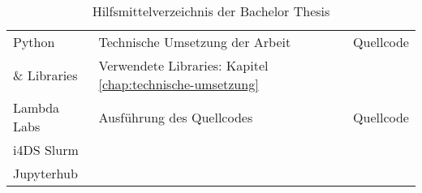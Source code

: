 \begin{table}[ht!]
\begin{tabular}{l|l|l}
        \hline
        Python & Technische Umsetzung der Arbeit &  Quellcode \\
        \& Libraries & Verwendete Libraries: Kapitel \ref{chap:technische-umsetzung} & \\
        
        \hline
        Lambda Labs & Ausführung des Quellcodes & Quellcode \\
        i4DS Slurm & & \\
        Jupyterhub & & \\
        
    \bottomrule
    \end{tabular}
    \caption{Hilfsmittelverzeichnis der Bachelor Thesis}
    \label{tab:hilfmittelverzeichnis}
\end{table}

